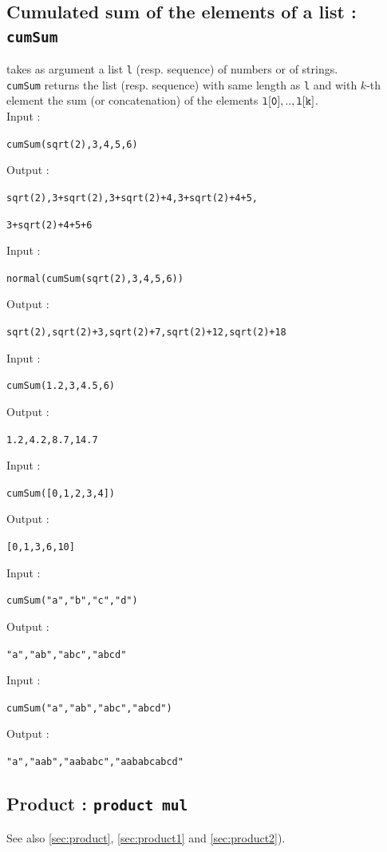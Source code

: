 \documentclass[a4paper,11pt]{book}
\begin{document}
\subsection{Cumulated sum of the elements of a list : {\tt cumSum}}
 takes as argument a list {\tt l} (resp. sequence) 
of numbers or of strings.\\
{\tt cumSum} returns the list (resp. sequence) with same length as {\tt l} and
 with $k$-th element the sum (or concatenation) of the 
elements ${\tt l[0],..,l[k]}$.\\
Input :
\begin{center}{\tt cumSum(sqrt(2),3,4,5,6)}\end{center}
Output :
\begin{center}{\tt sqrt(2),3+sqrt(2),3+sqrt(2)+4,3+sqrt(2)+4+5,}\end{center}
\begin{center}{\tt 3+sqrt(2)+4+5+6}\end{center}
Input :
\begin{center}{\tt normal(cumSum(sqrt(2),3,4,5,6))}\end{center}
Output :
\begin{center}{\tt  sqrt(2),sqrt(2)+3,sqrt(2)+7,sqrt(2)+12,sqrt(2)+18}\end{center}Input :
\begin{center}{\tt cumSum(1.2,3,4.5,6)}\end{center}
Output :
\begin{center}{\tt  1.2,4.2,8.7,14.7}\end{center}
Input :
\begin{center}{\tt cumSum([0,1,2,3,4])}\end{center}
Output :
\begin{center}{\tt  [0,1,3,6,10]}\end{center}
Input :
\begin{center}{\tt cumSum("a","b","c","d")}\end{center}
Output :
\begin{center}{\tt  "a","ab","abc","abcd"}\end{center}
Input :
\begin{center}{\tt cumSum("a","ab","abc","abcd")}\end{center}
Output :
\begin{center}{\tt "a","aab","aababc","aababcabcd"}\end{center}

\subsection{Product : {\tt product mul}}
See also \ref{sec:product}, \ref{sec:product1} and
\ref{sec:product2}).
\end{document}
